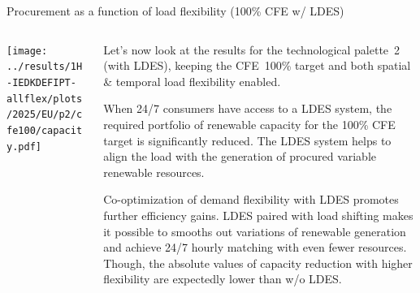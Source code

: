 \begin{frame}{Procurement as a function of load flexibility (100\% CFE w/ LDES)}

  {\footnotesize
  \vspace{0.2cm}
  
  \begin{columns}[T]

  \begin{column}{9cm}
  \centering
  \texttt{[image: ../results/1H-IEDKDEFIPT-allflex/plots/2025/EU/p2/cfe100/capacity.pdf]}
  \end{column}

  \begin{column}{6cm}
  \vspace{0.1cm}
  Let's now look at the results for the \alert{technological palette~2 (with LDES)}, keeping the CFE~100\% target and both spatial \& temporal load flexibility enabled.
  
  \vspace{0.1cm} 
  When 24/7 consumers have access to a LDES system, the required portfolio of renewable capacity for the 100\% CFE target is significantly reduced. The LDES system helps to align the load with the generation of procured variable renewable resources. 
  
  \vspace{0.1cm} 
  Co-optimization of demand flexibility with LDES \alert{promotes further efficiency gains}. LDES paired with load shifting makes it possible to smooths out variations of renewable generation and achieve 24/7 hourly matching with even fewer resources. Though, the absolute values of capacity reduction with higher flexibility are expectedly lower than w/o LDES.

  \end{column}
  \end{columns}
  }
\end{frame}


